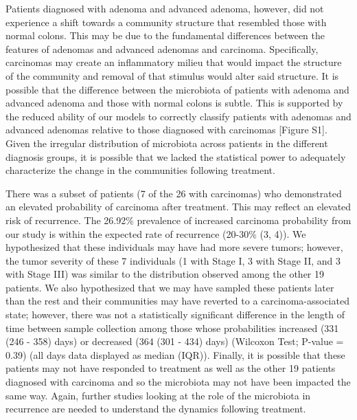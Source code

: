 \documentclass[12pt,]{article}
\begin{document}
Patients diagnosed with adenoma and advanced adenoma, however, did not
experience a shift towards a community structure that resembled those
with normal colons. This may be due to the fundamental differences
between the features of adenomas and advanced adenomas and carcinoma.
Specifically, carcinomas may create an inflammatory milieu that would
impact the structure of the community and removal of that stimulus would
alter said structure. It is possible that the difference between the
microbiota of patients with adenoma and advanced adenoma and those with
normal colons is subtle. This is supported by the reduced ability of our
models to correctly classify patients with adenomas and advanced
adenomas relative to those diagnosed with carcinomas {[}Figure S1{]}.
Given the irregular distribution of microbiota across patients in the
different diagnosis groups, it is possible that we lacked the
statistical power to adequately characterize the change in the
communities following treatment.

There was a subset of patients (7 of the 26 with carcinomas) who
demonstrated an elevated probability of carcinoma after treatment. This
may reflect an elevated risk of recurrence. The 26.92\% prevalence of
increased carcinoma probability from our study is within the expected
rate of recurrence (20-30\% (3, 4)). We hypothesized that these
individuals may have had more severe tumors; however, the tumor severity
of these 7 individuals (1 with Stage I, 3 with Stage II, and 3 with
Stage III) was similar to the distribution observed among the other 19
patients. We also hypothesized that we may have sampled these patients
later than the rest and their communities may have reverted to a
carcinoma-associated state; however, there was not a statistically
significant difference in the length of time between sample collection
among those whose probabilities increased (331 (246 - 358) days) or
decreased (364 (301 - 434) days) (Wilcoxon Test; P-value = 0.39) (all
days data displayed as median (IQR)). Finally, it is possible that these
patients may not have responded to treatment as well as the other 19
patients diagnosed with carcinoma and so the microbiota may not have
been impacted the same way. Again, further studies looking at the role
of the microbiota in recurrence are needed to understand the dynamics
following treatment.
\end{document}
